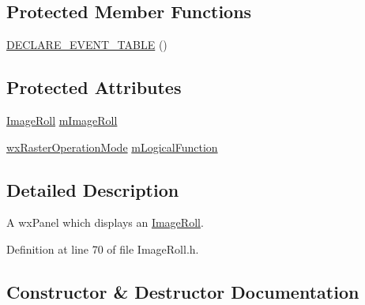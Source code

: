 \subsection*{Protected Member Functions}
\begin{DoxyCompactItemize}
\item 
\hyperlink{class_image_roll_panel_ab43228a1cca5a384fd8334348bfb9697}{D\+E\+C\+L\+A\+R\+E\+\_\+\+E\+V\+E\+N\+T\+\_\+\+T\+A\+B\+LE} ()
\end{DoxyCompactItemize}
\subsection*{Protected Attributes}
\begin{DoxyCompactItemize}
\item 
\hyperlink{class_image_roll}{Image\+Roll} \hyperlink{class_image_roll_panel_a40384b7c6dd382454674ee1eeca6b3ac}{m\+Image\+Roll}
\item 
\hyperlink{_image_roll_8h_a3bd7816d34a03863743710178ff6be2d}{wx\+Raster\+Operation\+Mode} \hyperlink{class_image_roll_panel_a6cd3b6ecdacd423e694d8273360817f2}{m\+Logical\+Function}
\end{DoxyCompactItemize}


\subsection{Detailed Description}
A wx\+Panel which displays an \hyperlink{class_image_roll}{Image\+Roll}. 

Definition at line 70 of file Image\+Roll.\+h.



\subsection{Constructor \& Destructor Documentation}
